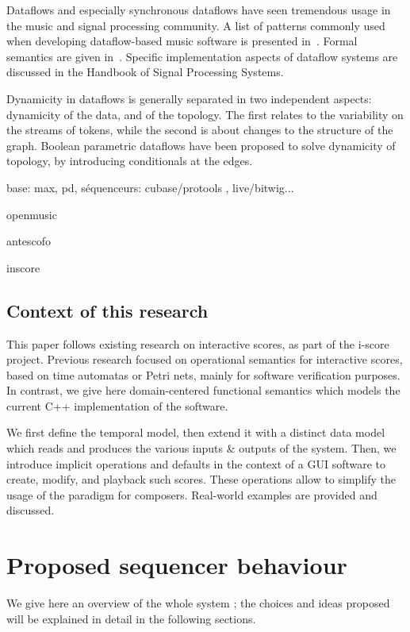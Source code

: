 \documentclass[applsci,article,submit,moreauthors,pdftex,10pt,a4paper]{mdpi}
\begin{document}
Dataflows and especially synchronous dataflows have seen tremendous usage in the music and signal processing community. 
A list of patterns commonly used when developing dataflow-based music software is presented in~\cite{arumi2006dataflow}.
Formal semantics are given in~\cite{benveniste_data-flow_1993}.
Specific implementation aspects of dataflow systems are discussed in the Handbook of Signal Processing Systems\cite{bhattacharyya_handbook_2013}. 

Dynamicity in dataflows is generally separated in two independent aspects: dynamicity of the data, and of the topology.
The first relates to the variability on the streams of tokens, while the second is about changes to the structure of the graph. 
Boolean parametric dataflows\cite{bempelis2015boolean} have been proposed to solve dynamicity of topology, by introducing conditionals at the edges.

base: max, pd, séquenceurs: cubase/protools , live/bitwig...

openmusic

antescofo

inscore


\subsection{Context of this research}
This paper follows existing research on interactive scores, as part of the i-score project.
Previous research focused on operational semantics for interactive scores, based on time automatas\cite{arias2016authoring} or Petri nets\cite{allombert2007system}, mainly for software verification purposes. 
In contrast, we give here domain-centered functional semantics which models the current C++ implementation of the software.

We first define the temporal model, then extend it with a distinct data model which reads and produces the various inputs \& outputs of the system. 
Then, we introduce implicit operations and defaults in the context of a GUI software to create, modify, and playback such scores. These operations allow to simplify the usage of the paradigm for composers.
Real-world examples are provided and discussed.

\cite{celerier2017icmc}

\section{Proposed sequencer behaviour}
We give here an overview of the whole system ; the choices and ideas proposed will be explained in detail in the following sections.
\end{document}
